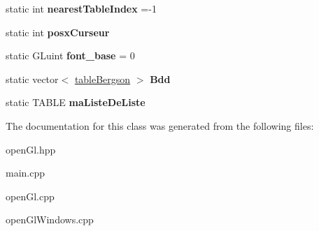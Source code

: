 \begin{DoxyCompactItemize}
\mbox{\label{classopenGlInterface_aa1da903bf927fa54e185f8ff3c495dd4}} 
static int {\bfseries nearest\+Table\+Index} =-\/1
\item 
\mbox{\label{classopenGlInterface_a6f7d4585d7c035ad2b47f922f52b26ec}} 
static int {\bfseries posx\+Curseur}
\item 
\mbox{\label{classopenGlInterface_ac0eaa737f4b46c8b599efde951de7af5}} 
static G\+Luint {\bfseries font\+\_\+base} = 0
\item 
\mbox{\label{classopenGlInterface_a97941ddeb831dc62993606e953124eba}} 
static vector$<$ \hyperlink{classtableBergson}{table\+Bergson} $>$ {\bfseries Bdd}
\item 
\mbox{\label{classopenGlInterface_aa3e67775fec268a61844158466bb4b61}} 
static T\+A\+B\+LE {\bfseries ma\+Liste\+De\+Liste}
\end{DoxyCompactItemize}


The documentation for this class was generated from the following files\+:\begin{DoxyCompactItemize}
\item 
open\+Gl.\+hpp\item 
main.\+cpp\item 
open\+Gl.\+cpp\item 
open\+Gl\+Windows.\+cpp\end{DoxyCompactItemize}
